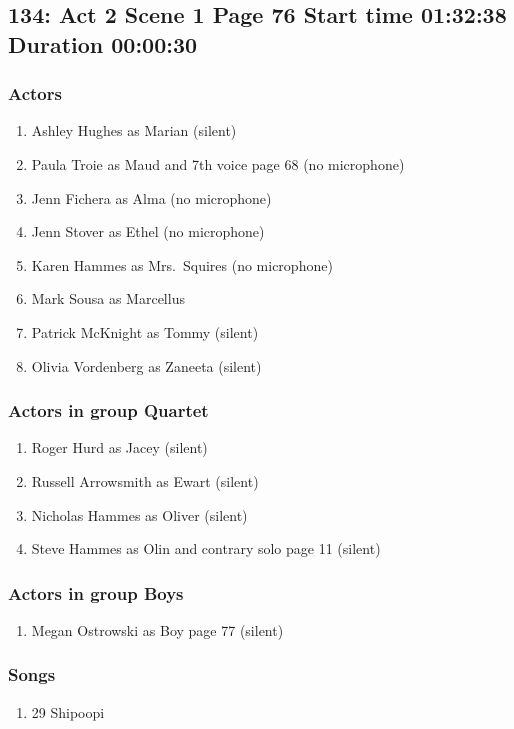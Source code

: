 \subsection{134: Act 2 Scene 1 Page 76 Start time 01:32:38 Duration 00:00:30}

\subsubsection{Actors}
\begin{enumerate}
\item Ashley Hughes as Marian (silent)
\item Paula Troie as Maud and 7th voice page 68 (no microphone)
\item Jenn Fichera as Alma (no microphone)
\item Jenn Stover as Ethel (no microphone)
\item Karen Hammes as Mrs.~Squires (no microphone)
\item Mark Sousa as Marcellus
\item Patrick McKnight as Tommy (silent)
\item Olivia Vordenberg as Zaneeta (silent)
\end{enumerate}
\subsubsection{Actors in group Quartet}
\begin{enumerate}
\item Roger Hurd as Jacey (silent)
\item Russell Arrowsmith as Ewart (silent)
\item Nicholas Hammes as Oliver (silent)
\item Steve Hammes as Olin and contrary solo page 11 (silent)
\end{enumerate}
\subsubsection{Actors in group Boys}
\begin{enumerate}
\item Megan Ostrowski as Boy page 77 (silent)
\end{enumerate}

\subsubsection{Songs}
\begin{enumerate}
\item 29 Shipoopi
\end{enumerate}
